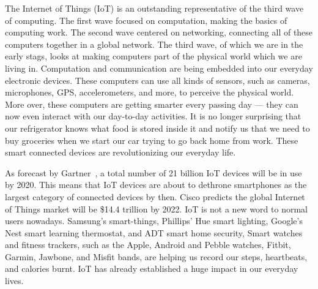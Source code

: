 The Internet of Things (IoT) is an outstanding representative of the third wave of computing. The first wave focused on computation, making the basics of computing work. The second wave centered on networking, connecting all of these computers together in a global network. The third wave, of which we are in the early stags, looks at making computers part of the physical world which we are living in. Computation and communication are being embedded into our everyday electronic devices. These computers can use all kinds of sensors, such as cameras, microphones, GPS, accelerometers, and more, to perceive the physical world. More over, these computers are getting smarter every passing day --- they can now even interact with our day-to-day activities. It is no longer surprising that our refrigerator knows what food is stored inside it and notify us that we need to buy groceries when we start our car trying to go back home from work. These smart connected devices are revolutionizing our everyday life. 


As forecast by Gartner~\cite{van_der_meulen_gartner_nodate}, a total number of 21 billion IoT devices will be in use by 2020. This means that IoT devices are about to dethrone smartphones as the largest category of connected devices by then. Cisco predicts the global Internet of Things market will be \$14.4 trillion by 2022.
IoT is not a new word to normal users nowadays. Samsung's smart-things, Phillips' Hue smart lighting, Google's Nest smart learning thermostat, and ADT smart home security, Smart watches and fitness trackers, such as the Apple, Android and Pebble watches, Fitbit, Garmin, Jawbone, and Misfit bands, are helping us record our steps, heartbeats, and calories burnt. IoT has already established a huge impact in our everyday lives. 

